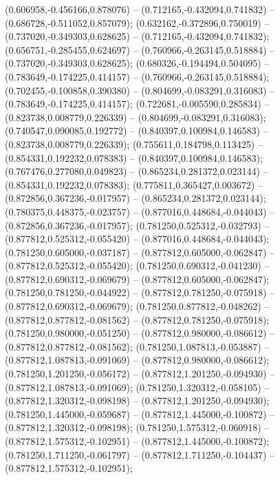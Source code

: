  (0.606958,-0.456166,0.878076) -- (0.712165,-0.432094,0.741832) -- (0.686728,-0.511052,0.857079);
 (0.632162,-0.372896,0.750019) -- (0.737020,-0.349303,0.628625) -- (0.712165,-0.432094,0.741832);
 (0.656751,-0.285455,0.624697) -- (0.760966,-0.263145,0.518884) -- (0.737020,-0.349303,0.628625);
 (0.680326,-0.194494,0.504095) -- (0.783649,-0.174225,0.414157) -- (0.760966,-0.263145,0.518884);
 (0.702455,-0.100858,0.390380) -- (0.804699,-0.083291,0.316083) -- (0.783649,-0.174225,0.414157);
 (0.722681,-0.005590,0.285834) -- (0.823738,0.008779,0.226339) -- (0.804699,-0.083291,0.316083);
 (0.740547,0.090085,0.192772) -- (0.840397,0.100984,0.146583) -- (0.823738,0.008779,0.226339);
 (0.755611,0.184798,0.113425) -- (0.854331,0.192232,0.078383) -- (0.840397,0.100984,0.146583);
 (0.767476,0.277080,0.049823) -- (0.865234,0.281372,0.023144) -- (0.854331,0.192232,0.078383);
 (0.775811,0.365427,0.003672) -- (0.872856,0.367236,-0.017957) -- (0.865234,0.281372,0.023144);
 (0.780375,0.448375,-0.023757) -- (0.877016,0.448684,-0.044043) -- (0.872856,0.367236,-0.017957);
 (0.781250,0.525312,-0.032793) -- (0.877812,0.525312,-0.055420) -- (0.877016,0.448684,-0.044043);
 (0.781250,0.605000,-0.037187) -- (0.877812,0.605000,-0.062847) -- (0.877812,0.525312,-0.055420);
 (0.781250,0.690312,-0.041230) -- (0.877812,0.690312,-0.069679) -- (0.877812,0.605000,-0.062847);
 (0.781250,0.781250,-0.044922) -- (0.877812,0.781250,-0.075918) -- (0.877812,0.690312,-0.069679);
 (0.781250,0.877812,-0.048262) -- (0.877812,0.877812,-0.081562) -- (0.877812,0.781250,-0.075918);
 (0.781250,0.980000,-0.051250) -- (0.877812,0.980000,-0.086612) -- (0.877812,0.877812,-0.081562);
 (0.781250,1.087813,-0.053887) -- (0.877812,1.087813,-0.091069) -- (0.877812,0.980000,-0.086612);
 (0.781250,1.201250,-0.056172) -- (0.877812,1.201250,-0.094930) -- (0.877812,1.087813,-0.091069);
 (0.781250,1.320312,-0.058105) -- (0.877812,1.320312,-0.098198) -- (0.877812,1.201250,-0.094930);
 (0.781250,1.445000,-0.059687) -- (0.877812,1.445000,-0.100872) -- (0.877812,1.320312,-0.098198);
 (0.781250,1.575312,-0.060918) -- (0.877812,1.575312,-0.102951) -- (0.877812,1.445000,-0.100872);
 (0.781250,1.711250,-0.061797) -- (0.877812,1.711250,-0.104437) -- (0.877812,1.575312,-0.102951);
